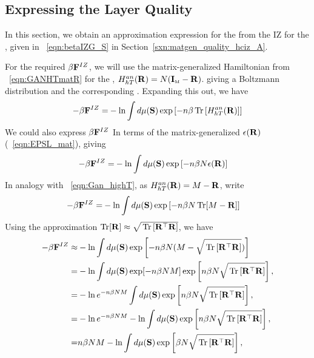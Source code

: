 \subsection{Expressing the Layer Quality}
\label{sxn:quality}

In this section, we obtain an approximation expression for the \LayerQualitySquared from the IZ \FreeEnergy for the \GeneralizationError, 
given in \EQN~\ref{eqn:betaIZG_S} in Section~\ref{sxn:matgen_quality_hciz_A}.

For the required \FreeEnergy $\beta\mathbf{F}^{IZ}$, we will use the matrix-generalized Hamiltonian
from \EQN~\ref{eqn:GANHTmatR} for the
\LayerQuality, $H^{an}_{hT}(\mathbf{R})=N(\mathbf{I}_{\text{\tiny M}}-\mathbf{R})$.
giving a Boltzmann distribution and the corresponding \ThermalAverage.  
Expanding this out, we have
\begin{align}
  \label{eqn:IZFE0}
  -\beta\mathbf{F}^{IZ} =& -  \ln \int d\mu(\mathbf{S}) \exp\left[-n\beta  \mbox{}\operatorname{Tr}\left[H^{an}_{hT}(\mathbf{R})\right]  \right] \\
\end{align}
We could also express $\beta\mathbf{F}^{IZ}$ In terms of the matrix-generalized \EffectivePotential $\epsilon(\mathbf{R})$
(\EQN~\ref{eqn:EPSL_mat}), giving
\begin{align}
  -\beta\mathbf{F}^{IZ} =& -  \ln \int d\mu(\mathbf{S}) \exp\left[-n\beta N \epsilon(\mathbf{R})  \right] 
\end{align}
In analogy with \EQN~\ref{eqn:Gan_highT}, 
as $H^{an}_{hT}(\mathbf{R})=M-\mathbf{R}$,  write
\begin{align}
-\beta\mathbf{F}^{IZ}  =& -  \ln \int d\mu(\mathbf{S}) \exp\left[-n\beta N \operatorname{Tr}[M-\mathbf{R}]  \right] 
\end{align}
Using the approximation $\operatorname{Tr}[\mathbf{R}]\approx\sqrt{\mbox{}\operatorname{Tr}\left[\mathbf{R}^{\top}\mathbf{R}\right]}$, we have
\begin{align}
  -\beta\mathbf{F}^{IZ} 
\approx& - \ln \int d\mu(\mathbf{S}) \exp\left[-n\beta N(M-\sqrt{\mbox{}\operatorname{Tr}\left[\mathbf{R}^{\top}\mathbf{R}\right]} ) \right] \\ 
\label{eqn:IZFE1}
=& -  \ln \int d\mu(\mathbf{S}) \exp[-n\beta NM]\exp\left[n\beta N\sqrt{\mbox{}\operatorname{Tr}\left[\mathbf{R}^{\top}\mathbf{R}\right]}\right], \\
\label{eqn:IZFE2}
=& -  \ln e^{-n\beta NM} \int d\mu(\mathbf{S}) \exp\left[n\beta N\sqrt{\mbox{}\operatorname{Tr}\left[\mathbf{R}^{\top}\mathbf{R}\right]}\right], \\
\label{eqn:IZFE3}
=& -  \ln e^{-n\beta NM} - \ln \int d\mu(\mathbf{S}) \exp\left[n\beta N\sqrt{\mbox{}\operatorname{Tr}\left[\mathbf{R}^{\top}\mathbf{R}\right]}\right], \\
\label{eqn:IZFE4}
=& n\beta NM - \ln \int d\mu(\mathbf{S}) \exp\left[\beta N\sqrt{\mbox{}\operatorname{Tr}\left[\mathbf{R}^{\top}\mathbf{R}\right]}\right], 
\end{align}

